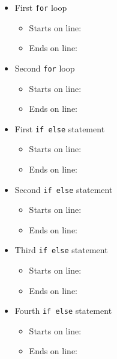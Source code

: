 \documentclass[
]{book}
\providecommand{\tightlist}{%
  \setlength{\itemsep}{0pt}\setlength{\parskip}{0pt}}
\begin{document}
\begin{itemize}
\tightlist
\item
  First \texttt{for} loop

  \begin{itemize}
  \tightlist
  \item
    Starts on line:
  \item
    Ends on line:
  \end{itemize}
\item
  Second \texttt{for} loop

  \begin{itemize}
  \tightlist
  \item
    Starts on line:
  \item
    Ends on line:
  \end{itemize}
\item
  First \texttt{if\ else} statement

  \begin{itemize}
  \tightlist
  \item
    Starts on line:
  \item
    Ends on line:
  \end{itemize}
\item
  Second \texttt{if\ else} statement

  \begin{itemize}
  \tightlist
  \item
    Starts on line:
  \item
    Ends on line:
  \end{itemize}
\item
  Third \texttt{if\ else} statement

  \begin{itemize}
  \tightlist
  \item
    Starts on line:
  \item
    Ends on line:
  \end{itemize}
\item
  Fourth \texttt{if\ else} statement

  \begin{itemize}
  \tightlist
  \item
    Starts on line:
  \item
    Ends on line:
  \end{itemize}
\end{itemize}
\end{document}
